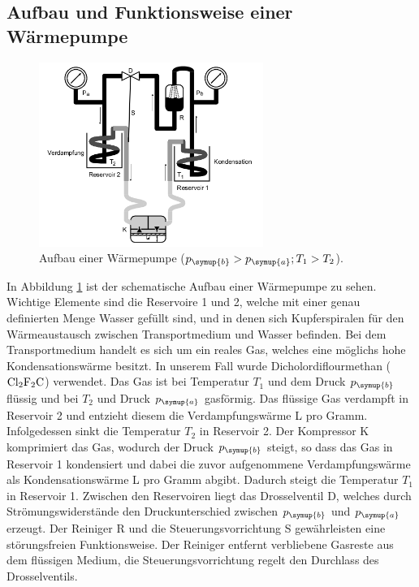   \subsection{Aufbau und Funktionsweise einer Wärmepumpe}
  \begin{figure}
    \centering
    \includegraphics[width=0.65\textwidth]{aufbau_waermepumpe.png}
    \caption{Aufbau einer Wärmepumpe ($p_\symup{b} > p_\symup{a}; T_1 > T_2$).}
    \label{fig:aufbau}
  \end{figure}
  In Abbildung \ref{fig:aufbau} ist der schematische Aufbau einer Wärmepumpe zu
  sehen. Wichtige Elemente sind die Reservoire 1 und 2, welche mit einer genau
  definierten Menge Wasser gefüllt sind, und in denen sich Kupferspiralen für den
  Wärmeaustausch zwischen Transportmedium und Wasser befinden. Bei dem Transportmedium
  handelt es sich um ein reales Gas, welches eine möglichs hohe Kondensationswärme
  besitzt. In unserem Fall wurde Dicholordiflourmethan ($\ce{Cl2F2C}$) verwendet.
  Das Gas ist bei Temperatur $T_1$ und dem Druck $p_\symup{b}$ flüssig und bei
  $T_2$ und Druck $p_\symup{a}$ gasförmig. Das flüssige Gas verdampft in Reservoir
  2 und entzieht diesem die Verdampfungswärme L pro Gramm. Infolgedessen sinkt die
  Temperatur $T_2$ in Reservoir 2.
  Der Kompressor K komprimiert das Gas, wodurch der Druck $p_\symup{b}$ steigt,
  so dass das Gas in Reservoir 1 kondensiert und dabei die zuvor aufgenommene
  Verdampfungswärme als Kondensationswärme L pro Gramm abgibt. Dadurch steigt die
  Temperatur $T_1$ in Reservoir 1.
  Zwischen den Reservoiren liegt das Drosselventil D, welches durch Strömungswiderstände
  den Druckunterschied zwischen $p_\symup{b}$ und $p_\symup{a}$ erzeugt.
  Der Reiniger R und die Steuerungsvorrichtung S gewährleisten eine störungsfreien
  Funktionsweise. Der Reiniger entfernt verbliebene Gasreste aus dem flüssigen
  Medium, die Steuerungsvorrichtung regelt den Durchlass des Drosselventils.


